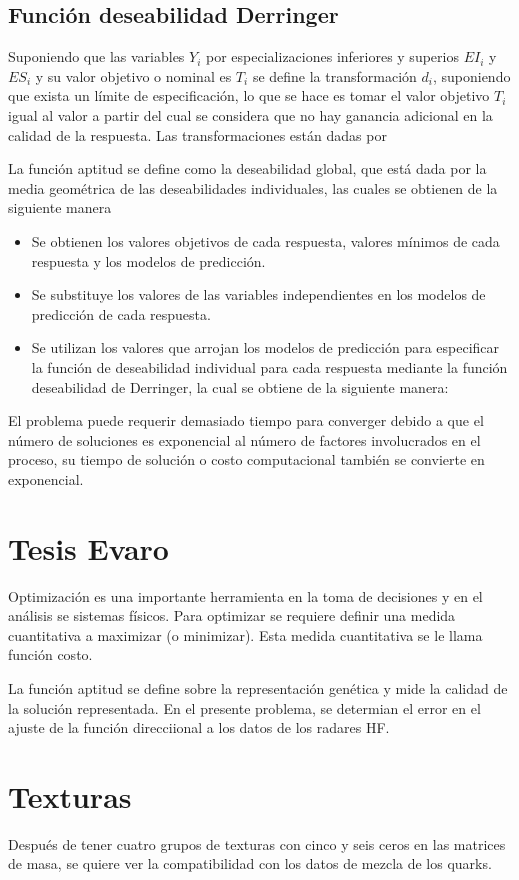 \subsection{Funci\'on deseabilidad Derringer}
Suponiendo que las variables $Y_i$ por especializaciones inferiores y superios
$EI_i$ y $ES_i$ y su valor objetivo o nominal es $T_i$ se define la 
transformaci\'on $d_i$, suponiendo que exista un l\'imite de especificaci\'on, 
lo que se hace es tomar el valor objetivo $T_i$ igual al valor a partir del cual
se considera que no hay ganancia adicional en la calidad de la respuesta. Las
transformaciones est\'an dadas por

La funci\'on aptitud se define como la deseabilidad global, que est\'a dada por
la media geom\'etrica de las deseabilidades individuales, las cuales se obtienen
de la siguiente  manera
\begin{itemize}
\item<1-> Se obtienen los valores objetivos de cada respuesta, valores m\'inimos
de cada respuesta y los modelos de predicci\'on.
\item<2-> Se substituye los valores de las variables independientes en los 
modelos de predicci\'on de cada respuesta.
\item<3-> Se utilizan los valores que arrojan los modelos de predicci\'on para
especificar la funci\'on de deseabilidad individual para cada respuesta mediante
la funci\'on deseabilidad de Derringer, la cual se obtiene de la siguiente 
manera:
\end{itemize}

El problema puede requerir demasiado tiempo para converger debido a que el 
n\'umero de soluciones es exponencial al n\'umero de factores involucrados en el
proceso, su tiempo de soluci\'on o costo computacional tambi\'en se convierte en
exponencial.

\section{Tesis Evaro}
Optimizaci\'on es una importante herramienta en la toma de decisiones y en el 
an\'alisis se sistemas f\'isicos. Para optimizar se requiere definir una medida
cuantitativa a maximizar (o minimizar). Esta medida cuantitativa se le llama 
funci\'on costo. 

La funci\'on aptitud se define sobre la representaci\'on gen\'etica y mide la
calidad de la soluci\'on representada. En el presente problema, se determian el 
error en el ajuste de la funci\'on direcciional a los datos de los radares HF.

\section{Texturas}
Despu\'es de tener cuatro grupos de texturas con cinco y seis ceros en las 
matrices de masa, se quiere ver la compatibilidad con los datos de mezcla de
los quarks.
